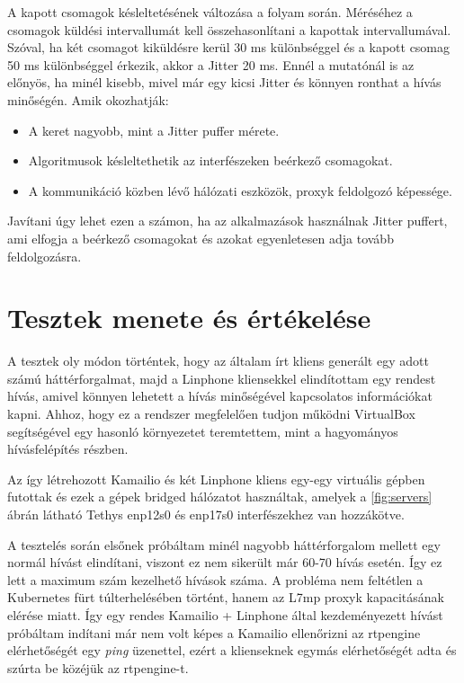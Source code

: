 A kapott csomagok késleltetésének változása a folyam során. Méréséhez a csomagok küldési intervallumát
kell összehasonlítani a kapottak intervallumával. Szóval, ha két csomagot kiküldésre kerül 30 ms 
különbséggel és a kapott csomag 50 ms különbséggel érkezik, akkor a Jitter 20 ms. Ennél a mutatónál is
az előnyös, ha minél kisebb, mivel már egy kicsi Jitter és könnyen ronthat a hívás minőségén. 
Amik okozhatják:

\begin{itemize}
	\item A keret nagyobb, mint a Jitter puffer mérete. 
	\item Algoritmusok késleltethetik az interfészeken beérkező csomagokat. 
	\item A kommunikáció közben lévő hálózati eszközök, proxyk feldolgozó képessége. 
\end{itemize}

Javítani úgy lehet ezen a számon, ha az alkalmazások használnak Jitter puffert, ami elfogja a
beérkező csomagokat és azokat egyenletesen adja tovább feldolgozásra. 

\section{Tesztek menete és értékelése}

A tesztek oly módon történtek, hogy az általam írt kliens generált egy adott számú háttérforgalmat, 
majd a Linphone kliensekkel elindítottam egy rendest hívás, amivel könnyen lehetett a hívás minőségével
kapcsolatos információkat kapni. Ahhoz, hogy ez a rendszer megfelelően tudjon működni VirtualBox
segítségével egy hasonló környezetet teremtettem, mint a hagyományos hívásfelépítés részben.

Az így létrehozott Kamailio és két Linphone kliens egy-egy virtuális gépben futottak és ezek a gépek 
bridged hálózatot használtak, amelyek a \ref{fig:servers} ábrán látható Tethys enp12s0 és enp17s0
interfészekhez van hozzákötve. 

A tesztelés során elsőnek próbáltam minél nagyobb háttérforgalom mellett egy normál hívást elindítani,
viszont ez nem sikerült már 60-70 hívás esetén. Így ez lett a maximum szám kezelhető hívások száma. 
A probléma nem feltétlen a Kubernetes fürt túlterhelésében történt, hanem az L7mp proxyk kapacitásának 
elérése miatt. Így egy rendes Kamailio + Linphone által kezdeményezett hívást próbáltam indítani már 
nem volt képes a Kamailio ellenőrizni az rtpengine elérhetőségét egy \textit{ping} üzenettel, ezért
a klienseknek egymás elérhetőségét adta és szúrta be közéjük az rtpengine-t.


